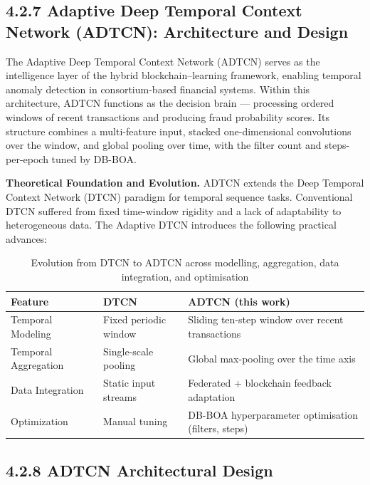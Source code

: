 \subsection*{4.2.7 Adaptive Deep Temporal Context Network (ADTCN): Architecture and Design}

The Adaptive Deep Temporal Context Network (ADTCN) serves as the intelligence layer of the hybrid blockchain–learning framework, enabling temporal anomaly detection in consortium-based financial systems. Within this architecture, ADTCN functions as the decision brain — processing ordered windows of recent transactions and producing fraud probability scores. Its structure combines a multi-feature input, stacked one-dimensional convolutions over the window, and global pooling over time, with the filter count and steps-per-epoch tuned by DB-BOA.

\textbf{Theoretical Foundation and Evolution.}
ADTCN extends the Deep Temporal Context Network (DTCN) paradigm for temporal sequence tasks. Conventional DTCN suffered from fixed time-window rigidity and a lack of adaptability to heterogeneous data. The Adaptive DTCN introduces the following practical advances:

\begin{table}[H]
\centering
\caption{Evolution from DTCN to ADTCN across modelling, aggregation, data integration, and optimisation}
\label{tab:dtcn_to_adtcn}
\begin{tabular}{|p{3.0cm}|p{4.7cm}|p{5.6cm}|}
\hline
\textbf{Feature} & \textbf{DTCN} & \textbf{ADTCN (this work)} \\ \hline
Temporal Modeling & Fixed periodic window & Sliding ten-step window over recent transactions \\ \hline
Temporal Aggregation & Single-scale pooling & Global max-pooling over the time axis \\ \hline
Data Integration & Static input streams & Federated + blockchain feedback adaptation \\ \hline
Optimization & Manual tuning & DB-BOA hyperparameter optimisation (filters, steps) \\ \hline
\end{tabular}
\end{table}

\subsection*{4.2.8 ADTCN Architectural Design}

